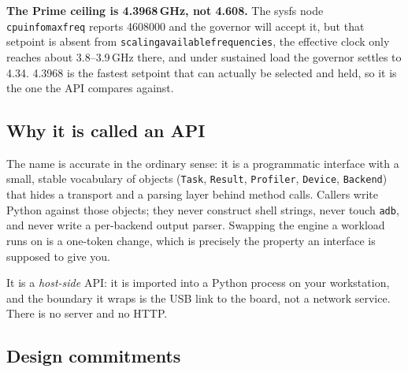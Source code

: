 \documentclass[11pt,a4paper]{article}
\newcommand{\code}[1]{\texttt{\let\_\breakableunderscore #1}}
\newcommand{\breakableunderscore}{\textunderscore\allowbreak}
\begin{document}
\noindent \textbf{The Prime ceiling is 4.3968\,GHz, not 4.608.} The sysfs node
\code{cpuinfo\_max\_freq} reports 4608000 and the governor will accept it, but
that setpoint is absent from \code{scaling\_available\_frequencies}, the
effective clock only reaches about 3.8--3.9\,GHz there, and under sustained load
the governor settles to 4.34. 4.3968 is the fastest setpoint that can actually
be selected and held, so it is the one the API compares against.

\subsection{Why it is called an API}

The name is accurate in the ordinary sense: it is a programmatic interface with
a small, stable vocabulary of objects (\code{Task}, \code{Result},
\code{Profiler}, \code{Device}, \code{Backend}) that hides a transport and a
parsing layer behind method calls. Callers write Python against those objects;
they never construct shell strings, never touch \code{adb}, and never write a
per-backend output parser. Swapping the engine a workload runs on is a
one-token change, which is precisely the property an interface is supposed to
give you.

It is a \emph{host-side} API: it is imported into a Python process on your
workstation, and the boundary it wraps is the USB link to the board, not a
network service. There is no server and no HTTP.

\subsection{Design commitments}
\end{document}

